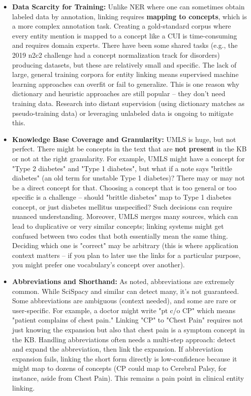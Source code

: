 \begin{itemize}
\item \textbf{Data Scarcity for Training:} Unlike NER where one can sometimes obtain labeled data by annotation, linking requires \textbf{mapping to concepts}, which is a more complex annotation task. Creating a gold-standard corpus where every entity mention is mapped to a concept like a CUI is time-consuming and requires domain experts. There have been some shared tasks (e.g., the 2019 n2c2 challenge had a concept normalization track for disorders) producing datasets, but these are relatively small and specific. The lack of large, general training corpora for entity linking means supervised machine learning approaches can overfit or fail to generalize. This is one reason why dictionary and heuristic approaches are still popular – they don't need training data. Research into distant supervision (using dictionary matches as pseudo-training data) or leveraging unlabeled data is ongoing to mitigate this.

\item \textbf{Knowledge Base Coverage and Granularity:} UMLS is huge, but not perfect. There might be concepts in the text that are \textbf{not present} in the KB or not at the right granularity. For example, UMLS might have a concept for "Type 2 diabetes" and "Type 1 diabetes", but what if a note says "brittle diabetes" (an old term for unstable Type 1 diabetes)? There may or may not be a direct concept for that. Choosing a concept that is too general or too specific is a challenge – should "brittle diabetes" map to Type 1 diabetes concept, or just diabetes mellitus unspecified? Such decisions can require nuanced understanding. Moreover, UMLS merges many sources, which can lead to duplicative or very similar concepts; linking systems might get confused between two codes that both essentially mean the same thing. Deciding which one is "correct" may be arbitrary (this is where application context matters – if you plan to later use the links for a particular purpose, you might prefer one vocabulary's concept over another).

\item \textbf{Abbreviations and Shorthand:} As noted, abbreviations are extremely common. While SciSpacy and similar can detect many, it's not guaranteed. Some abbreviations are ambiguous (context needed), and some are rare or user-specific. For example, a doctor might write "pt c/o CP" which means "patient complains of chest pain." Linking "CP" to "Chest Pain" requires not just knowing the expansion but also that chest pain is a symptom concept in the KB. Handling abbreviations often needs a multi-step approach: detect and expand the abbreviation, then link the expansion. If abbreviation expansion fails, linking the short form directly is low-confidence because it might map to dozens of concepts (CP could map to Cerebral Palsy, for instance, aside from Chest Pain). This remains a pain point in clinical entity linking.


\end{itemize}
